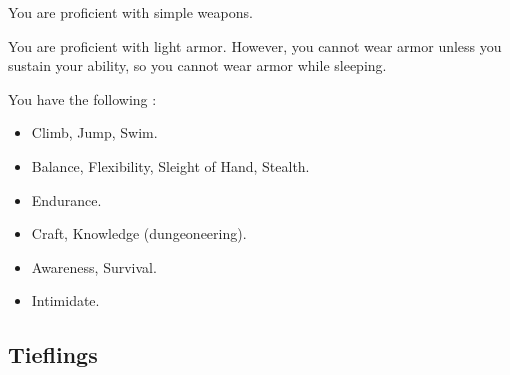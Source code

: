             You are proficient with simple weapons.

            You are proficient with light armor.
            However, you cannot wear armor unless you sustain your  ability, so you cannot wear armor while sleeping.

            You have the following :
            \begin{itemize}
                \item {} Climb, Jump, Swim.
                \item {} Balance, Flexibility, Sleight of Hand, Stealth.
                \item {} Endurance.
                \item {} Craft, Knowledge (dungeoneering).
                \item {} Awareness, Survival.
                \item {} Intimidate.
            \end{itemize}

    \subsection{Tieflings}

